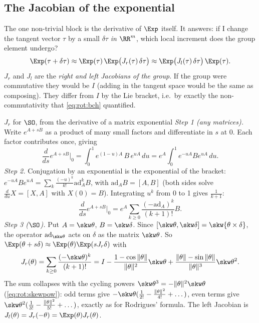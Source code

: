 \subsection{The Jacobian of the exponential}\label{sec:lie:exp-jacobian}

The one non-trivial block is the derivative of $\Exp$ itself. It answers: if I change the tangent vector $\tau$ by a small $\delta\tau$ \emph{in $\RR^m$}, which local increment does the group element undergo?
\[
\Exp(\tau+\delta\tau)\approx\Exp(\tau)\,\Exp\big(J_r(\tau)\,\delta\tau\big)\approx\Exp\big(J_l(\tau)\,\delta\tau\big)\,\Exp(\tau).
\]
$J_r$ and $J_l$ are the \emph{right and left Jacobians of the group}. If the group were commutative they would be $I$ (adding in the tangent space would be the same as composing). They differ from $I$ by the Lie bracket, i.e.\ by exactly the non-commutativity that \eqref{eq:rot:bch} quantified.

\begin{deriv}{$J_r$ for $\SO$, from the derivative of a matrix exponential}
\emph{Step 1 (any matrices).} Write $e^{A+sB}$ as a product of many small factors and differentiate in $s$ at $0$. Each factor contributes once, giving
\[
\frac{d}{ds}e^{A+sB}\Big|_{0}=\int_0^1 e^{(1-u)A}\,B\,e^{uA}\,du=e^{A}\int_0^1 e^{-uA}Be^{uA}\,du .
\]
\emph{Step 2.} Conjugation by an exponential is the exponential of the bracket: $e^{-uA}Be^{uA}=\sum_k\frac{(-u)^k}{k!}\mathrm{ad}_A^kB$, with $\mathrm{ad}_AB=[A,B]$ (both sides solve $\frac{d}{du}X=[X,A]$ with $X(0)=B$). Integrating $u^k$ from 0 to 1 gives $\frac1{k+1}$:
\[
\frac{d}{ds}e^{A+sB}\Big|_{0}=e^{A}\sum_{k\ge0}\frac{(-\mathrm{ad}_A)^k}{(k+1)!}B .
\]
\emph{Step 3 ($\SO$).} Put $A=\skw\theta$, $B=\skw\delta$. Since $[\skw\theta,\skw\delta]=\skw{\theta\times\delta}$, the operator $\mathrm{ad}_{\skw\theta}$ acts on $\delta$ as the matrix $\skw\theta$. So $\Exp(\theta+s\delta)\approx\Exp(\theta)\Exp(sJ_r\delta)$ with
\[
J_r(\theta)=\sum_{k\ge0}\frac{(-\skw\theta)^k}{(k+1)!}=I-\frac{1-\cos\|\theta\|}{\|\theta\|^2}\skw\theta+\frac{\|\theta\|-\sin\|\theta\|}{\|\theta\|^3}\skw\theta^2 .
\]
The sum collapses with the cycling powers $\skw\theta^3=-\|\theta\|^2\skw\theta$ (\eqref{eq:rot:skewpow}): odd terms give $-\skw\theta(\frac1{2!}-\frac{\|\theta\|^2}{4!}+\dots)$, even terms give $\skw\theta^2(\frac1{3!}-\frac{\|\theta\|^2}{5!}+\dots)$, exactly as for Rodrigues' formula. The left Jacobian is $J_l(\theta)=J_r(-\theta)=\Exp(\theta)J_r(\theta)$.
\end{deriv}

